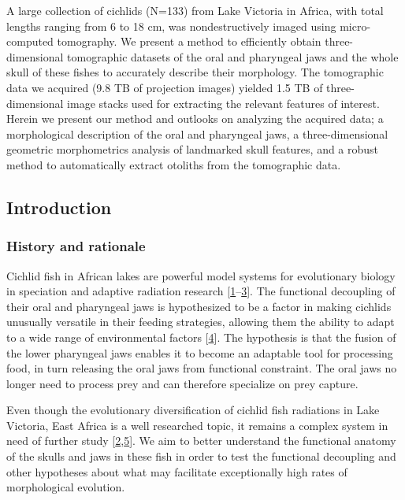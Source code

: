 A large collection of cichlids (N=133) from Lake Victoria in Africa, with total lengths ranging from 6 to 18 cm, was nondestructively imaged using micro-computed tomography.
We present a method to efficiently obtain three-dimensional tomographic datasets of the oral and pharyngeal jaws and the whole skull of these fishes to accurately describe their morphology.
The tomographic data we acquired (9.8 TB of projection images) yielded 1.5 TB of three-dimensional image stacks used for extracting the relevant features of interest.
Herein we present our method and outlooks on analyzing the acquired data; a morphological description of the oral and pharyngeal jaws, a three-dimensional geometric morphometrics analysis of landmarked skull features, and a robust method to automatically extract otoliths from the tomographic data.

\hypertarget{introduction}{%
\subsection{Introduction}\label{introduction}}

\hypertarget{history-and-rationale}{%
\subsubsection{History and rationale}\label{history-and-rationale}}

Cichlid fish in African lakes are powerful model systems for evolutionary biology in speciation and adaptive radiation research {[}\protect\hyperlink{ref-TUQFenhc}{1}--\protect\hyperlink{ref-WVIa4CH0}{3}{]}.
The functional decoupling of their oral and pharyngeal jaws is hypothesized to be a factor in making cichlids unusually versatile in their feeding strategies, allowing them the ability to adapt to a wide range of environmental factors {[}\protect\hyperlink{ref-1GEljkDsf}{4}{]}.
The hypothesis is that the fusion of the lower pharyngeal jaws enables it to become an adaptable tool for processing food, in turn releasing the oral jaws from functional constraint.
The oral jaws no longer need to process prey and can therefore specialize on prey capture.

Even though the evolutionary diversification of cichlid fish radiations in Lake Victoria, East Africa is a well researched topic, it remains a complex system in need of further study {[}\protect\hyperlink{ref-W2f2SDjn}{2},\protect\hyperlink{ref-c3poTogo}{5}{]}.
We aim to better understand the functional anatomy of the skulls and jaws in these fish in order to test the functional decoupling and other hypotheses about what may facilitate exceptionally high rates of morphological evolution.

